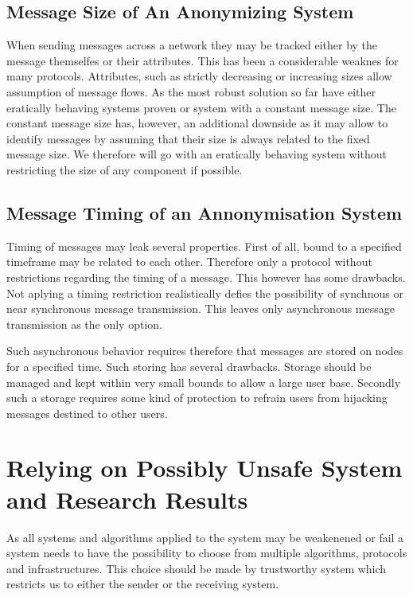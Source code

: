 \subsection{Message Size of An Anonymizing System}
When sending messages across a network they may be tracked either by the message themselfes or their attributes. This has been  a considerable weaknes  for many protocols. Attributes, such as strictly decreasing or increasing sizes allow assumption of message flows. As the most robust solution so far have either eratically behaving systems proven or system with a constant message size. The constant message size has, however, an additional downside as it may allow to identify messages by assuming that their size is always related to the fixed message size. We therefore will go with an eratically behaving system without restricting the size of any component if possible.

\subsection{Message Timing of an Annonymisation System}
Timing of messages may leak several properties. First of all, bound to a specified timeframe may be related to each other. Therefore only a protocol without restrictions regarding the timing of a message. This however has some drawbacks. Not aplying a timing restriction realistically defies the possibility of synchnous or near synchronous message transmission. This leaves only asynchronous message transmission as the only option.

Such asynchronous behavior requires therefore that messages are stored on nodes for a specified time. Such storing has several drawbacks. Storage should be managed and kept within very small bounds to allow a large user base. Secondly such a storage requires some kind of protection to refrain users from hijacking messages destined to other users.

\section{Relying on Possibly Unsafe System and Research Results}
As all systems and algorithms applied to the system may be weakenened or fail a system needs to have the possibility to choose from multiple algorithms, protocols and infrastructures. This choice should be made by trustworthy system which restricts us to either the sender or the receiving system.


